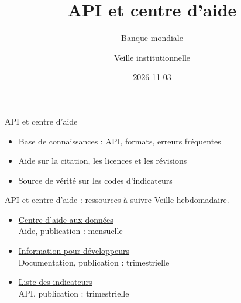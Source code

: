 \documentclass[aspectratio=169,11pt]{beamer}
\title{API et centre d'aide}
\subtitle{Banque mondiale}
\author{Veille institutionnelle}
\date{2026-11-03}
\begin{document}
\begin{frame}\titlepage\end{frame}

\begin{frame}{API et centre d'aide}
\begin{itemize}
\item Base de connaissances : API, formats, erreurs fréquentes
\item Aide sur la citation, les licences et les révisions
\item Source de vérité sur les codes d'indicateurs
\end{itemize}
\end{frame}

\begin{frame}{API et centre d'aide : ressources à suivre}
\small
Veille hebdomadaire.
\begin{itemize}
\item \href{https://datahelpdesk.worldbank.org}{Centre d'aide aux données}\\{\footnotesize Aide, publication : mensuelle}
\item \href{https://datahelpdesk.worldbank.org/knowledgebase/articles/889386-developer-information}{Information pour développeurs}\\{\footnotesize Documentation, publication : trimestrielle}
\item \href{https://api.worldbank.org/v2/indicator?format=json&per_page=5}{Liste des indicateurs}\\{\footnotesize API, publication : trimestrielle}
\end{itemize}
\end{frame}
\end{document}
